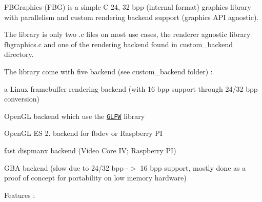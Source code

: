 F\+B\+Graphics (F\+BG) is a simple C 24, 32 bpp (internal format) graphics library with parallelism and custom rendering backend support (graphics A\+PI agnostic).

The library is only two .c files on most use cases, the renderer agnostic library {\ttfamily fbgraphics.\+c} and one of the rendering backend found in {\ttfamily custom\+\_\+backend} directory.

The library come with five backend (see {\ttfamily custom\+\_\+backend} folder) \+:
\begin{DoxyItemize}
\item a Linux framebuffer rendering backend (with 16 bpp support through 24/32 bpp conversion)
\item Open\+GL backend which use the \href{http://www.glfw.org/}{\tt G\+L\+FW} library
\item Open\+GL ES 2. backend for fbdev or Raspberry PI
\item fast dispmanx backend (Video Core IV; Raspberry PI)
\item G\+BA backend (slow due to 24/32 bpp -\/$>$ 16 bpp support, mostly done as a proof of concept for portability on low memory hardware)
\end{DoxyItemize}

Features \+:


